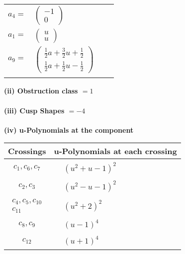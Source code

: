 \documentclass[1p]{elsarticle_modified}
\theoremstyle{definition}
\begin{document}
\begin{tabular}{m{7pt} m{180pt} m{7pt} m{180pt} }
\flushright $a_{4}=$&$\begin{pmatrix}-1\\0\end{pmatrix}$ \\
\flushright $a_{1}=$&$\begin{pmatrix}u\\u\end{pmatrix}$ \\
\flushright $a_{9}=$&$\begin{pmatrix}\frac{1}{2} a+\frac{3}{2} u+\frac{1}{2}\\\frac{1}{2} a+\frac{1}{2} u-\frac{1}{2}\end{pmatrix}$\\&\end{tabular}
\flushleft \textbf{(ii) Obstruction class $= 1$}\\~\\
\flushleft \textbf{(iii) Cusp Shapes $= -4$}\\~\\
\newpage\renewcommand{\arraystretch}{1}
\flushleft \textbf{(iv) u-Polynomials at the component}\newline \\
\begin{tabular}{m{50pt}|m{274pt}}
Crossings & \hspace{64pt}u-Polynomials at each crossing \\
\hline $$\begin{aligned}c_{1},c_{6},c_{7}\end{aligned}$$&$\begin{aligned}
&(u^2+u-1)^2
\end{aligned}$\\
\hline $$\begin{aligned}c_{2},c_{3}\end{aligned}$$&$\begin{aligned}
&(u^2- u-1)^2
\end{aligned}$\\
\hline $$\begin{aligned}c_{4},c_{5},c_{10}\\c_{11}\end{aligned}$$&$\begin{aligned}
&(u^2+2)^2
\end{aligned}$\\
\hline $$\begin{aligned}c_{8},c_{9}\end{aligned}$$&$\begin{aligned}
&(u-1)^4
\end{aligned}$\\
\hline $$\begin{aligned}c_{12}\end{aligned}$$&$\begin{aligned}
&(u+1)^4
\end{aligned}$\\
\hline
\end{tabular}\\~\\
\end{document}
